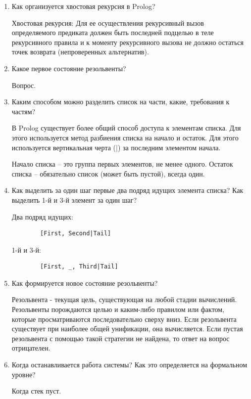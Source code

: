 \documentclass[12pt, a4paper]{extarticle}
\begin{document}
\begin{enumerate} 
	\item Как организуется хвостовая рекурсия в Prolog? 
	
	Хвостовая рекурсия: Для ее осуществления рекурсивный вызов определяемого предиката должен быть последней подцелью в теле рекурсивного правила и к моменту рекурсивного вызова не должно остаться точек возврата (непроверенных альтернатив). 
	
	\item Какое первое состояние резольвенты?
	
	Вопрос. 
	
	\item Каким способом можно разделить список на части, какие, требования к частям?
	
	В Prolog существует более общий способ доступа к элементам списка. Для этого используется метод разбиения списка на начало и остаток. Для этого используется вертикальная черта (|) за последним элементом начала. 
	
	Начало списка -- это группа первых элементов, не менее одного. Остаток списка -- обязательно список (может быть пустой), всегда один. 
	
	\item Как выделить за один шаг первые два подряд идущих элемента списка? Как выделить 1-й и 3-й элемент за один шаг?
	
	Два подряд идущих:
	
	\begin{lstlisting}
		[First, Second|Tail]
	\end{lstlisting}
	
	1-й и 3-й:
	
	\begin{lstlisting}
		[First, _, Third|Tail]
	\end{lstlisting}
	
	\item Как формируется новое состояние резольвенты?
	
	Резольвента - текущая цель, существующая на любой стадии вычислений. Резольвенты порождаются целью и каким-либо правилом или фактом, которые просматриваются последовательно сверху вниз. Если резольвента существует при наиболее общей унификации, она вычисляется. Если пустая резольвента с помощью такой стратегии не найдена, то ответ на вопрос отрицателен.
	
	\item Когда останавливается работа системы? Как это определяется на формальном уровне?
	
	Когда стек пуст. 
	
\end{enumerate}
\end{document}

